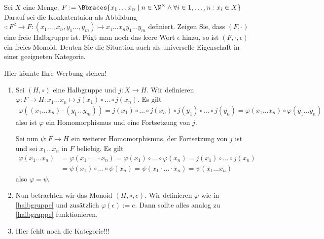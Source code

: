 \begin{exercise}
    Sei $X$ eine Menge. $F := \Bbraces{x_1 \dots x_n \mid n \in \N^\times \land \forall i \in {1, \dots, n}: x_i \in X}$ Darauf sei die Konkatentaion als Abbildung $\cdot: F^2 \to F: (x_1 \dots, x_n, y_1 \dots, y_m) \mapsto x_1 \dots x_n y_1 \dots y_m$ definiert. Zeigen Sie, dass $(F, \cdot)$ eine freie Halbgruppe ist. Fügt man noch das leere Wort $\epsilon$ hinzu, so ist $(F, \cdot, \epsilon)$ ein freies Monoid. Deuten Sie die Situation auch als universelle Eigenschaft in einer geeigneten Kategorie.
\end{exercise}

\begin{solution}
    Hier könnte Ihre Werbung stehen!
    \begin{enumerate}[label = \arabic*)]
        \item \label{halbgruppe} Sei $(H, \circ)$ eine Halbgruppe und $j:X \to H$. Wir definieren $\varphi: F \to H: x_1 \dots x_n \mapsto j(x_1) \circ \dots \circ j(x_n)$. Es gilt
        \begin{align*}
            \varphi((x_1 \dots x_n) \cdot (y_1 \dots y_m)) = j(x_1) \circ \dots \circ j(x_n) \circ j(y_1) \circ \dots \circ j(y_n) = \varphi(x_1 \dots x_n) \circ \varphi(y_1 \dots y_n)
        \end{align*} 
        also ist $\varphi$ ein Homomorphismus und eine Fortsetzung von $j$.

        Sei nun $\psi: F \to H$ ein weiterer Homomorphismus, der Fortsetzung von $j$ ist und sei $x_1 \dots x_n$ in $F$ beliebig. Es gilt
        \begin{align*}
            \varphi(x_1 \dots x_n) &= \varphi(x_1 \cdot \dots \cdot x_n) = \varphi(x_1) \circ \dots \circ \varphi(x_n) = j(x_1) \circ \dots \circ j(x_n) \\
            &= \psi(x_1) \circ \dots \circ \psi(x_n) = \psi(x_1 \cdot \dots \cdot x_n) = \psi(x_1 \dots x_n)
        \end{align*}
        also $\varphi = \psi$.
        \item Nun betrachten wir das Monoid $(H, \circ, e)$. Wir definieren $\varphi$ wie in \ref{halbgruppe} und zusätzlich $\varphi(\epsilon) := e$. Dann sollte alles analog zu \ref{halbgruppe} funktionieren. 
        \item Hier fehlt noch die Kategorie!!!
    \end{enumerate}
\end{solution}